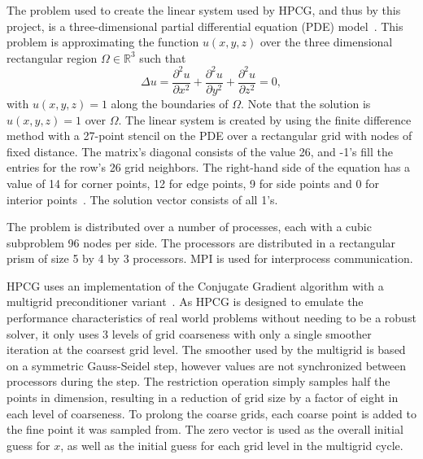 The problem used to create the linear system used by HPCG, and thus by this project, is a three-dimensional partial differential equation (PDE) model~\cite{Dongarra:2015:HPCG}.
This problem is approximating the function \(u(x, y, z)\) over the three dimensional rectangular region \(\Omega\in\mathbb{R}^3\) such that
\[
	\Delta u = \frac{\partial^2 u}{\partial x^2} + \frac{\partial^2 u}{\partial y^2} + \frac{\partial^2 u}{\partial z^2} = 0,
\] with \(u(x, y, z) = 1\) along the boundaries of \(\Omega\).
Note that the solution is \(u(x, y, z) = 1\) over \(\Omega\).
The linear system is created by using the finite difference method with a 27-point stencil on the PDE over a rectangular grid with nodes of fixed distance.
The matrix's diagonal consists of the value 26, and -1's fill the entries for the row's 26 grid neighbors.
The right-hand side of the equation has a value of 14 for corner points, 12 for edge points, 9 for side points and 0 for interior points~\cite{Kincaid:2009:Numerical}.
The solution vector consists of all 1's.

The problem is distributed over a number of processes, each with a cubic subproblem 96 nodes per side.
The processors are distributed in a rectangular prism of size 5 by 4 by 3 processors.
MPI is used for interprocess communication.

HPCG uses an implementation of the Conjugate Gradient algorithm with a multigrid preconditioner variant~\cite{Dongarra:2015:HPCG}.
As HPCG is designed to emulate the performance characteristics of real world problems without needing to be a robust solver, it only uses 3 levels of grid coarseness with only a single smoother iteration at the coarsest grid level.
The smoother used by the multigrid is based on a symmetric Gauss-Seidel step, however values are not synchronized between processors during the step.
The restriction operation simply samples half the points in dimension, resulting in a reduction of grid size by a factor of eight in each level of coarseness.
To prolong the coarse grids, each coarse point is added to the fine point it was sampled from.
The zero vector is used as the overall initial guess for \(x\), as well as the initial guess for each grid level in the multigrid cycle.

